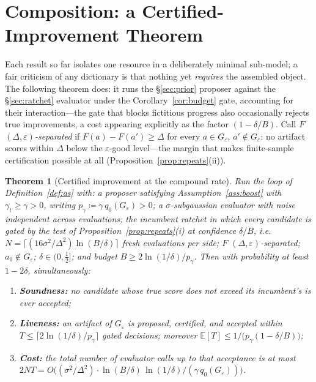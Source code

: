 \documentclass{article}
\theoremstyle{plain}
\newtheorem{theorem}{Theorem}[section]
\theoremstyle{definition}
\theoremstyle{remark}
\newcommand{\E}{\mathbb{E}}
\newcommand{\eps}{\varepsilon}
\newcommand{\pgam}{p_{\gamma}}
\begin{document}
\section{Composition: a Certified-Improvement Theorem}
\label{sec:composition}

Each result so far isolates one resource in a deliberately minimal sub-model; a fair criticism of any dictionary is that nothing yet \emph{requires} the assembled object. The following theorem does: it runs the \S\ref{sec:prior} proposer against the \S\ref{sec:ratchet} evaluator under the Corollary~\ref{cor:budget} gate, accounting for their interaction---the gate that blocks fictitious progress also occasionally rejects true improvements, a cost appearing explicitly as the factor $(1 - \delta/B)$. Call $F$ \emph{$(\Delta,\eps)$-separated} if $F(a) - F(a') \ge \Delta$ for every $a \in G_\eps$, $a' \notin G_\eps$: no artifact scores within $\Delta$ below the $\eps$-good level---the margin that makes finite-sample certification possible at all (Proposition~\ref{prop:repeats}(ii)).

\begin{theorem}[Certified improvement at the compound rate]
\label{thm:composed}
Run the loop of Definition~\ref{def:as} with: a proposer satisfying Assumption~\ref{ass:boost} with $\gamma_t \ge \gamma > 0$, writing $\pgam \coloneqq \gamma\, q_0(G_\eps) > 0$; a $\sigma$-subgaussian evaluator with noise independent across evaluations; the incumbent ratchet in which every candidate is gated by the test of Proposition~\ref{prop:repeats}(i) at confidence $\delta/B$, i.e.\ $N = \lceil (16\sigma^2/\Delta^2)\ln(B/\delta) \rceil$ fresh evaluations per side; $F$ $(\Delta,\eps)$-separated; $a_0 \notin G_\eps$; $\delta \in (0, \tfrac12]$; and budget $B \ge 2\ln(1/\delta)/\pgam$. Then with probability at least $1 - 2\delta$, simultaneously:
\begin{enumerate}\itemsep1pt
\item[(i)] \textbf{Soundness:} no candidate whose true score does not exceed its incumbent's is ever accepted;
\item[(ii)] \textbf{Liveness:} an artifact of $G_\eps$ is proposed, certified, and accepted within
$T \le \big\lceil 2\ln(1/\delta)/\pgam \big\rceil$ gated decisions; moreover $\E[T] \le 1/\big(\pgam (1 - \delta/B)\big)$;
\item[(iii)] \textbf{Cost:} the total number of evaluator calls up to that acceptance is at most
$2NT = O\big( (\sigma^2/\Delta^2)\cdot \ln(B/\delta)\,\ln(1/\delta) / (\gamma\, q_0(G_\eps)) \big)$.
\end{enumerate}
\end{theorem}
\end{document}
